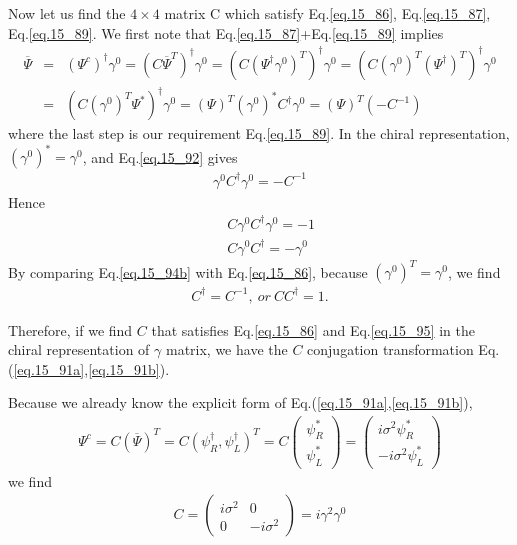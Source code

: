 \documentclass[12pt]{article}
\def\dgr{\dagger}
\begin{document}
{  Now let us find the $4\times 4$ matrix C which satisfy Eq.\ref{eq.15_86}, Eq.\ref{eq.15_87}, Eq.\ref{eq.15_89}.
  We first note that Eq.\ref{eq.15_87}+Eq.\ref{eq.15_89} implies
\begin{eqnarray}
  {\overline \Psi}
  &=& (\Psi^c)^\dagger \gamma^0
  = (C {\overline \Psi}^T)^\dagger \gamma^0
  = (C (\Psi^\dagger \gamma^0)^T)^\dagger \gamma^0
  = (C (\gamma^0)^T (\Psi^\dagger)^T)^\dagger \gamma^0\nonumber \\
  &=& (C (\gamma^0)^T \Psi^*)^\dagger \gamma^0
  = (\Psi)^T (\gamma^0)^* C^\dagger \gamma^0
  = (\Psi)^T (-C^{-1}) \label{eq.15_92}
\end{eqnarray}
  where the last step is our requirement Eq.\ref{eq.15_89}. In the chiral
  representation, $(\gamma^0)^* = \gamma^0$, and Eq.\ref{eq.15_92} gives
\begin{eqnarray}
  \gamma^0 C^\dgr \gamma^0 = -C^{-1}\label{eq.15_93}
\end{eqnarray}
  Hence
\begin{eqnarray}
  && C \gamma^0 C^\dagger \gamma^0 = -1 \label{eq.15_94a}\\
  && C \gamma^0 C^\dagger = -\gamma^0 \label{eq.15_94b}
\end{eqnarray}
  By comparing Eq.\ref{eq.15_94b} with Eq.\ref{eq.15_86}, because $(\gamma^0)^T = \gamma^0$, we find
\begin{eqnarray}
  C^\dgr = C^{-1},~or~C C^\dgr = 1. \label{eq.15_95}
\end{eqnarray}

  Therefore, if we find $C$ that satisfies Eq.\ref{eq.15_86} and Eq.\ref{eq.15_95} in the chiral representation of $\gamma$ matrix, we have the $C$ conjugation transformation Eq.(\ref{eq.15_91a},\ref{eq.15_91b}).

  Because we already know the explicit form of Eq.(\ref{eq.15_91a},\ref{eq.15_91b}),
\begin{eqnarray}
  \Psi^c = C ( {\overline \Psi})^T
  = C (\psi_R^\dgr, \psi_L^\dgr)^T
  = C
  \begin{pmatrix}
  \psi_R^* \\ \psi_L^*
  \end{pmatrix}
  =
  \begin{pmatrix}
  i\sigma^2 \psi_R^* \\ -i\sigma^2 \psi_L^*
  \end{pmatrix}\label{eq.15_96}
\end{eqnarray}
  we find
\begin{eqnarray}
  C=
  \begin{pmatrix}
    i\sigma^2   &    0  \\
    0   & -i\sigma^2 
  \end{pmatrix}
  = i \gamma^2 \gamma^0 \label{eq.15_97}
\end{eqnarray}

}
\end{document}
